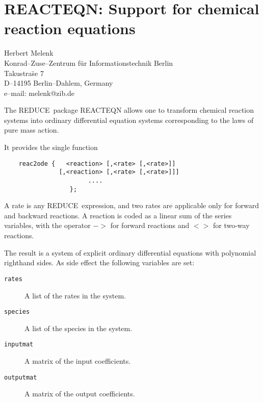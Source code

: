 \documentclass[11pt,letterpaper]{book}
\makeatletter
\newcommand{\REDUCE}{REDUCE}
\newcommand{\underscore}{\_}
\newcommand{\ttindex}[1]{{\renewcommand{\_}{\protect\underscore}%
                          \index{#1@{\tt #1}}}}
\makeatother
\begin{document}
\chapter[REACTEQN: Chemical reaction equations]%
        {REACTEQN: Support for chemical reaction equations}
\label{REACTEQN}

{\footnotesize
\begin{center}
Herbert Melenk \\
Konrad--Zuse--Zentrum f\"ur Informationstechnik Berlin \\
Takustra\"se 7 \\
D--14195 Berlin--Dahlem, Germany \\[0.05in]
e--mail: melenk@zib.de
\end{center}
}
\ttindex{REACTEQN}

The \REDUCE\ package REACTEQN allows one to transform chemical reaction
systems into ordinary differential equation systems corresponding to
the laws of pure mass action.

It provides the single function

{\small\begin{verbatim}
    reac2ode {   <reaction> [,<rate> [,<rate>]]
               [,<reaction> [,<rate> [,<rate>]]]
                       ....
                  };
\end{verbatim}}

A rate is any \REDUCE\ expression, and two rates are applicable only
for forward and backward reactions.  A reaction is coded as a linear
sum of the series variables, with the operator $->$ for forward
reactions and $<>$ for two-way reactions.

The result is a system of explicit ordinary differential equations
with polynomial righthand sides.  As side effect the following
variables are set:
\newpage
\begin{description}
\item[{\tt rates}]
 A list of the rates in the system.
\item[{\tt species}]
 A list of the species in the system.
\item[{\tt inputmat}]
 A matrix of the input coefficients.
\item[{\tt outputmat}]
 A matrix of the output coefficients.
\end{description}
\end{document}

